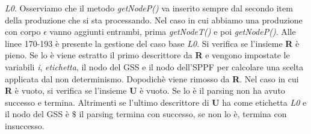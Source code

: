 \textit{L0}. Osserviamo che il metodo \textit{getNodeP()} va inserito sempre dal secondo item della produzione che si sta processando. Nel caso in cui abbiamo una produzione con corpo $\epsilon$ vanno aggiunti entrambi, prima \textit{getNodeT()} e poi \textit{getNodeP()}. Alle linee 170-193 è presente la gestione del caso base \textit{L0}. Si verifica se l'insieme \textbf{R} è pieno. Se lo è viene estratto il primo descrittore da \textbf{R} e vengono impostate le variabili \textit{i}, \textit{etichetta}, il nodo del GSS e il nodo dell'SPPF per calcolare una scelta applicata dal non determinismo. Dopodichè viene rimosso da \textbf{R}. Nel caso in cui \textbf{R} è vuoto, si verifica se l'insieme \textbf{U} è vuoto. Se lo è il parsing non ha avuto successo e termina. Altrimenti se l'ultimo descrittore di \textbf{U} ha come etichetta \textit{L0} e il nodo del GSS è $\$$ il parsing termina con successo, se non lo è, termina con insuccesso.